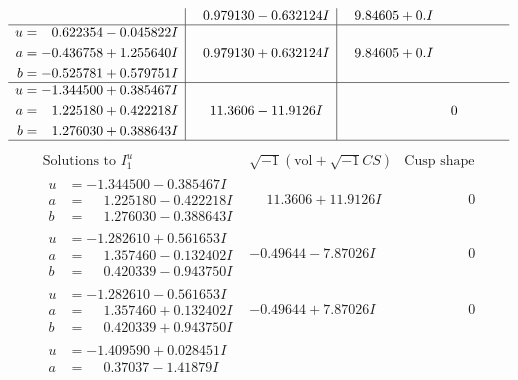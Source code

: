 \documentclass[1p]{elsarticle_modified}
\theoremstyle{definition}
\newcommand{\I}{\sqrt{-1}}
\begin{document}
$$\begin{array}{c|c|c}
 & \phantom{-}0.979130 - 0.632124 I & \phantom{-}9.84605 + 0. I\phantom{ +0.000000I} \\ \hline\begin{aligned}
u &= \phantom{-}0.622354 - 0.045822 I \\
a &= -0.436758 + 1.255640 I \\
b &= -0.525781 + 0.579751 I\end{aligned}
 & \phantom{-}0.979130 + 0.632124 I & \phantom{-}9.84605 + 0. I\phantom{ +0.000000I} \\ \hline\begin{aligned}
u &= -1.344500 + 0.385467 I \\
a &= \phantom{-}1.225180 + 0.422218 I \\
b &= \phantom{-}1.276030 + 0.388643 I\end{aligned}
 & \phantom{-}11.3606 - 11.9126 I & \phantom{-0.000000 } 0\\
 \hline 
 \end{array}$$\newpage$$\begin{array}{c|c|c}  
\text{Solutions to }I^u_{1}& \I (\text{vol} + \sqrt{-1}CS) & \text{Cusp shape}\\
 \hline 
\begin{aligned}
u &= -1.344500 - 0.385467 I \\
a &= \phantom{-}1.225180 - 0.422218 I \\
b &= \phantom{-}1.276030 - 0.388643 I\end{aligned}
 & \phantom{-}11.3606 + 11.9126 I & \phantom{-0.000000 } 0 \\ \hline\begin{aligned}
u &= -1.282610 + 0.561653 I \\
a &= \phantom{-}1.357460 - 0.132402 I \\
b &= \phantom{-}0.420339 - 0.943750 I\end{aligned}
 & -0.49644 - 7.87026 I & \phantom{-0.000000 } 0 \\ \hline\begin{aligned}
u &= -1.282610 - 0.561653 I \\
a &= \phantom{-}1.357460 + 0.132402 I \\
b &= \phantom{-}0.420339 + 0.943750 I\end{aligned}
 & -0.49644 + 7.87026 I & \phantom{-0.000000 } 0 \\ \hline\begin{aligned}
u &= -1.409590 + 0.028451 I \\
a &= \phantom{-}0.37037 - 1.41879 I \\

\end{aligned}
\end{array}$$
\end{document}
